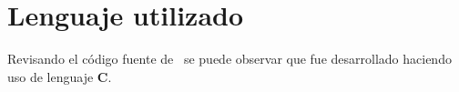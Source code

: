 \section{Lenguaje utilizado}

 Revisando el código fuente de \vsftpd\ se puede observar que fue desarrollado haciendo uso de lenguaje {\bf C}.

